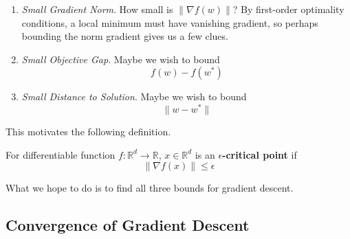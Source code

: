 	\begin{enumerate}
	  \item \textit{Small Gradient Norm}. How small is $\| \nabla f(w)\|$? By first-order optimality conditions, a local minimum must have vanishing gradient, so perhaps bounding the norm gradient gives us a few clues. 

		\item \textit{Small Objective Gap}. Maybe we wish to bound 
			\begin{equation}
			  f(w) - f(w^\ast) 
			\end{equation}

		\item \textit{Small Distance to Solution}. Maybe we wish to bound 
			\begin{equation}
			  \|w - w^\ast\|
			\end{equation}
	\end{enumerate}

	This motivates the following definition. 

	\begin{definition}
		For differentiable function $f: \mathbb{R}^d \to \mathbb{R}$, $x \in \mathbb{R}^d$ is an \textbf{$\epsilon$-critical point} if 
		\begin{equation}
		  \|\nabla f(x)\| \leq \epsilon
		\end{equation}
	\end{definition}

	What we hope to do is to find all three bounds for gradient descent. 

\subsection{Convergence of Gradient Descent}

